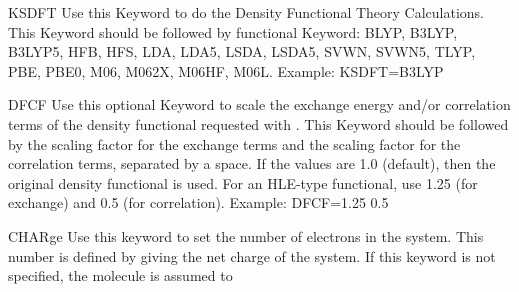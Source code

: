 \begin{keywordlist}
\item[KSDFT]
Use this Keyword to do the Density Functional Theory Calculations.
This Keyword should be followed by functional Keyword:
BLYP, B3LYP, B3LYP5, HFB, HFS, LDA, LDA5, LSDA, LSDA5, SVWN, SVWN5, TLYP, PBE, PBE0, M06, M062X, M06HF, M06L.
Example: KSDFT=B3LYP
\item[DFCF]
Use this optional Keyword to scale the exchange energy and/or correlation terms of the density functional requested with .
This Keyword should be followed by the scaling factor for the exchange terms and the scaling factor for the correlation terms, separated by a space.
If the values are 1.0 (default), then the original density functional is used.
For an HLE-type functional, use 1.25 (for exchange) and 0.5 (for correlation).
Example: DFCF=1.25 0.5
\item[CHARge]
Use this keyword to set the number of electrons in the system.
This number is defined by giving the net charge of the system.
If this keyword is not specified, the molecule is assumed to

\end{keywordlist}

